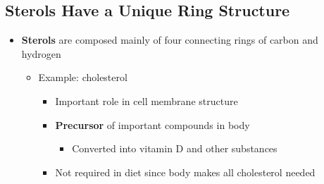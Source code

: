 \documentclass[12pt]{article}
\begin{document}
        \subsection{Sterols Have a Unique Ring Structure}
            \begin{itemize}
                \item \textbf{Sterols} are composed mainly of four connecting rings of carbon and hydrogen
                    \begin{itemize}
                        \item Example: cholesterol
                            \begin{itemize}
                                \item Important role in cell membrane structure
                                \item \textbf{Precursor} of important compounds in body
                                    \begin{itemize}
                                        \item Converted into vitamin D and other substances
                                    \end{itemize}
                                \item Not required in diet since body makes all cholesterol needed
                            \end{itemize}
                    \end{itemize}
            \end{itemize}
\end{document}
